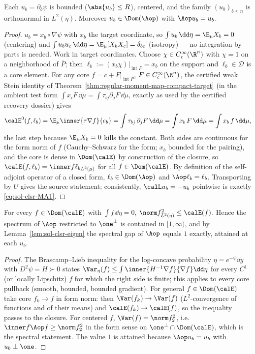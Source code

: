 \documentclass[../main.tex]{subfiles}
\begin{document}
\begin{lemma}
\label{lem:sol-clsr-eigen}
Each $u_b=\partial_b\psi$ is bounded ($\abs{u_b}\le R$), centered, and the family
$(u_b)_{b\le n}$ is orthonormal in $L^2(\eta)$.  Moreover $u_b\in\Dom(\Aop)$ with
$\Aop u_b=u_b$.
\end{lemma}

\begin{proof}
$u_b=x_b\circ\nabla\psi$ with $x_b$ the target coordinate, so
$\int u_b\,\dd\eta=\E_\mu X_b=0$ (centering) and
$\int u_bu_c\,\dd\eta=\E_\mu[X_bX_c]=\delta_{bc}$ (isotropy) --- no integration by parts is
needed.  Work in target coordinates.  Choose $\chi\in C_c^\infty(\R^n)$ with $\chi=1$ on a
neighborhood of $\overline P$; then $\ell_b:=(x_b\chi)|_{\operatorname{int}P}=x_b$ on the
support and $\ell_b\in\mathscr D$ is a core element.  For any core
$f=c+F|_{\operatorname{int}P}$, $F\in C_c^\infty(\R^n)$, the certified weak Stein identity of
Theorem~\ref{thm:regular-moment-map-compact-target} (in the ambient test form
$\int x_iF\,\dd\mu=\int\tau_{ij}\partial_jF\,\dd\mu$, exactly as used by the certified
recovery dossier) gives
\[
  \calE^0(f,\ell_b)
  =\E_\mu\inner{\tau\nabla f}{e_b}
  =\int\tau_{bj}\,\partial_jF\,\dd\mu
  =\int x_b\,F\,\dd\mu
  =\int x_b\,f\,\dd\mu ,
\]
the last step because $\E_\mu X_b=0$ kills the constant.  Both sides are continuous for the
form norm of $f$ (Cauchy--Schwarz for the form; $x_b$ bounded for the pairing), and the core is
dense in $\Dom(\calE)$ by construction of the closure, so
$\calE(f,\ell_b)=\inner f{\ell_b}_{L^2(\mu)}$ for all $f\in\Dom(\calE)$.  By definition of the
self-adjoint operator of a closed form, $\ell_b\in\Dom(\Aop)$ and $\Aop\ell_b=\ell_b$.
Transporting by $U$ gives the source statement; consistently,
$\calL u_b=-u_b$ pointwise is exactly \eqref{eq:sol-clsr-MA1}.
\end{proof}

\begin{lemma}
\label{lem:sol-clsr-BL}
For every $f\in\Dom(\calE)$ with $\int f\,\dd\eta=0$,
$\norm f_{L^2(\eta)}^2\le\calE(f)$.  Hence the spectrum of $\Aop$ restricted to
$\one^\perp$ is contained in $[1,\infty)$, and by Lemma~\ref{lem:sol-clsr-eigen} the spectral
gap of $\Aop$ equals $1$ exactly, attained at each $u_b$.
\end{lemma}

\begin{proof}
The Brascamp--Lieb inequality \cite{BrascampLieb1976} for the log-concave probability
$\eta=e^{-\psi}\dd y$ with $D^2\psi=H\succ0$ states
$\Var_\eta(f)\le\int\inner{H^{-1}\nabla f}{\nabla f}\dd\eta$ for every $C^1$ (or locally
Lipschitz) $f$ for which the right side is finite; this applies to every core pullback
(smooth, bounded, bounded gradient).  For general $f\in\Dom(\calE)$ take core $f_k\to f$ in
form norm: then $\Var(f_k)\to\Var(f)$ ($L^2$-convergence of functions and of their means) and
$\calE(f_k)\to\calE(f)$, so the inequality passes to the closure.  For centered $f$,
$\Var(f)=\norm f_2^2$, i.e.\ $\inner f{\Aop f}\ge\norm f_2^2$ in the form sense on
$\one^\perp\cap\Dom(\calE)$, which is the spectral statement.  The value $1$ is attained
because $\Aop u_b=u_b$ with $u_b\perp\one$.
\end{proof}
\end{document}
